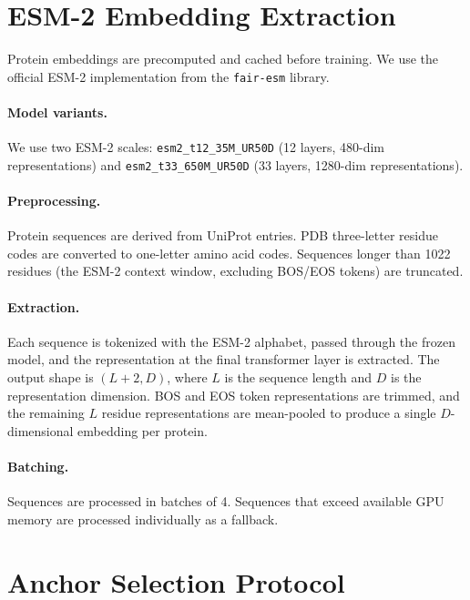 \documentclass[11pt]{article}
\begin{document}
\section{ESM-2 Embedding Extraction}
\label{sec:esm2}

Protein embeddings are precomputed and cached before training. We use the official ESM-2 implementation from the \texttt{fair-esm} library.

\paragraph{Model variants.}
We use two ESM-2 scales: \texttt{esm2\_t12\_35M\_UR50D} (12 layers, 480-dim representations) and \texttt{esm2\_t33\_650M\_UR50D} (33 layers, 1280-dim representations).

\paragraph{Preprocessing.}
Protein sequences are derived from UniProt entries. PDB three-letter residue codes are converted to one-letter amino acid codes. Sequences longer than 1022 residues (the ESM-2 context window, excluding BOS/EOS tokens) are truncated.

\paragraph{Extraction.}
Each sequence is tokenized with the ESM-2 alphabet, passed through the frozen model, and the representation at the final transformer layer is extracted. The output shape is $(L{+}2, D)$, where $L$ is the sequence length and $D$ is the representation dimension. BOS and EOS token representations are trimmed, and the remaining $L$ residue representations are mean-pooled to produce a single $D$-dimensional embedding per protein.

\paragraph{Batching.}
Sequences are processed in batches of 4. Sequences that exceed available GPU memory are processed individually as a fallback.

\section{Anchor Selection Protocol}
\label{sec:anchor_selection}
\end{document}
